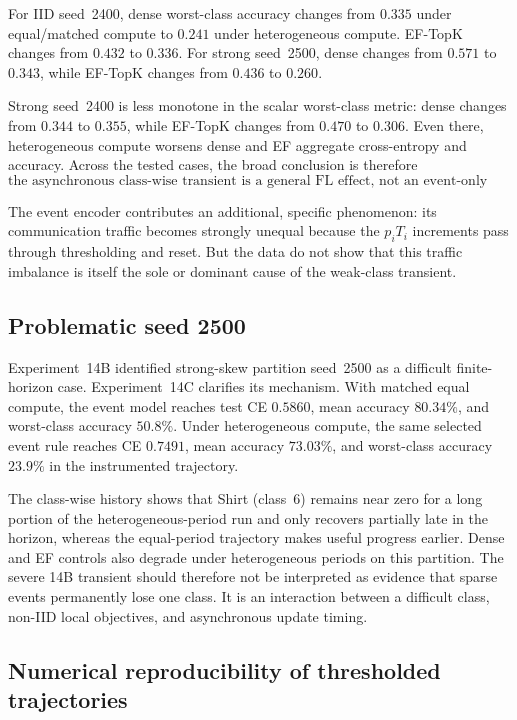 For IID seed~2400, dense worst-class accuracy changes from $0.335$ under equal/matched compute to $0.241$ under heterogeneous compute. EF-TopK changes from $0.432$ to $0.336$. For strong seed~2500, dense changes from $0.571$ to $0.343$, while EF-TopK changes from $0.436$ to $0.260$.

Strong seed~2400 is less monotone in the scalar worst-class metric: dense changes from $0.344$ to $0.355$, while EF-TopK changes from $0.470$ to $0.306$. Even there, heterogeneous compute worsens dense and EF aggregate cross-entropy and accuracy. Across the tested cases, the broad conclusion is therefore
\begin{equation}
\boxed{\text{the asynchronous class-wise transient is a general FL effect, not an event-only failure.}}
\end{equation}

The event encoder contributes an additional, specific phenomenon: its communication traffic becomes strongly unequal because the $p_iT_i$ increments pass through thresholding and reset. But the data do not show that this traffic imbalance is itself the sole or dominant cause of the weak-class transient.

\subsection{Problematic seed 2500}

Experiment~14B identified strong-skew partition seed~2500 as a difficult finite-horizon case. Experiment~14C clarifies its mechanism. With matched equal compute, the event model reaches test CE $0.5860$, mean accuracy $80.34\%$, and worst-class accuracy $50.8\%$. Under heterogeneous compute, the same selected event rule reaches CE $0.7491$, mean accuracy $73.03\%$, and worst-class accuracy $23.9\%$ in the instrumented trajectory.

The class-wise history shows that Shirt (class~6) remains near zero for a long portion of the heterogeneous-period run and only recovers partially late in the horizon, whereas the equal-period trajectory makes useful progress earlier. Dense and EF controls also degrade under heterogeneous periods on this partition. The severe 14B transient should therefore not be interpreted as evidence that sparse events permanently lose one class. It is an interaction between a difficult class, non-IID local objectives, and asynchronous update timing.

\subsection{Numerical reproducibility of thresholded trajectories}

